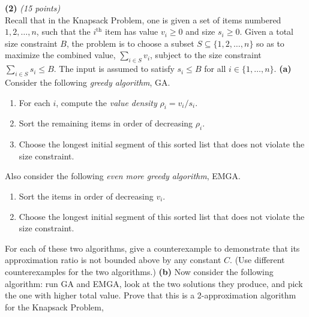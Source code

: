 \documentclass[11pt]{article}
\def\gap{0.1in}
\begin{document}
\setlength{\parindent}{0in}
\addtolength{\parskip}{0.1cm}
\setlength{\fboxrule}{.5mm}\setlength{\fboxsep}{1.2mm}
\newlength{\boxlength}\setlength{\boxlength}{\textwidth}
\addtolength{\boxlength}{-4mm}
\begin{center}
\end{center}
\vspace{5mm}

{\bf (2)} {\em (15 points)}\\
Recall that in the Knapsack Problem, one is given
a set of items numbered $1,2,\ldots,n$,
such that the $i^{\mathrm{th}}$ item has value $v_i \geq 0$
and size $s_i \geq 0.$  Given a total size
constraint $B$, the problem is to choose a
subset $S \subseteq \{1,2,\ldots,n\}$ so
as to maximize the combined value, $\sum_{i \in S} v_i$,
subject to the size constraint $\sum_{i \in S} s_i \leq B.$
The input is assumed to satisfy $s_i \le B$ for all $i \in \{1,\ldots,n\}$.
\vskip \gap
{\bf (a)}
Consider the following \emph{greedy algorithm}, GA.
\begin{enumerate}
\item For each  $i$, 
compute the \emph{value density} $\rho_i = v_i/s_i.$
\item Sort the remaining items in order of decreasing $\rho_i$.
\item Choose the longest initial segment of this sorted list 
that does not violate the size constraint.
\end{enumerate}
Also consider the following
\emph{even more greedy algorithm}, EMGA.
\begin{enumerate}
\item Sort the items in order of decreasing $v_i$.
\item Choose the longest initial segment of this sorted
list that does not violate the size constraint.
\end{enumerate}
For each of these two algorithms, give a
counterexample to demonstrate 
that its approximation ratio 
is not bounded above by any constant $C$.
(Use different counterexamples for the two algorithms.)
\vskip \gap
{\bf (b)}
Now consider the following algorithm: run GA and EMGA,
look at the two solutions they produce, and pick the
one with higher total value.  Prove that this is
a 2-approximation algorithm for the Knapsack Problem,
\end{document}
